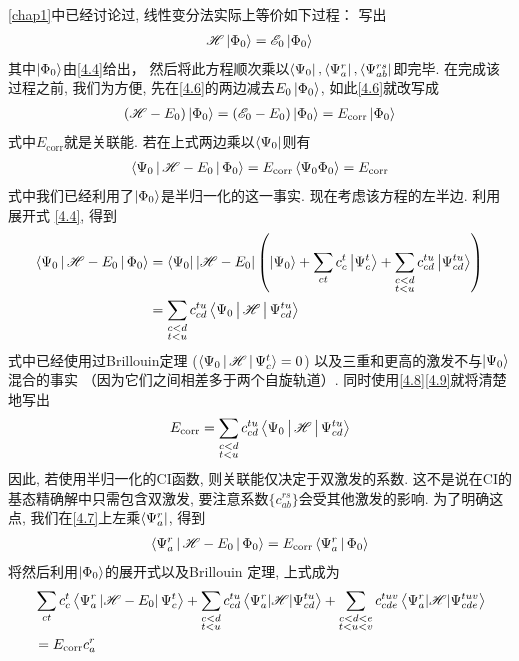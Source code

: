 \autoref*{chap1}中已经讨论过, 线性变分法实际上等价如下过程： 写出
\begin{align}
\mathscr{H}\Ket{\Phi_0} = \mathscr{E}_0\Ket{\Phi_0}
\label{4.6}
\end{align}
其中$ \Ket{\Phi_0} $由\eqref{4.4}给出， 
然后将此方程顺次乘以$ \Bra{\Psi_0},\Bra{\Psi_a^r} ,\Bra{\Psi_{ab}^{rs}}$即完毕. 
在完成该过程之前, 
我们为方便, 
先在\eqref{4.6}的两边减去$ E_0\Ket{\Phi_0} $, 
如此\eqref{4.6}就改写成
\begin{align}
(\mathscr{H} -E_0)\Ket{\Phi_0} = (\mathscr{E}_0-E_0)\Ket{\Phi_0} = E_\mathrm{corr} \Ket{\Phi_0}
\label{4.7}
\end{align} 
式中$E_\mathrm{corr}$就是关联能. 
若在上式两边乘以$\Bra{\Psi_0}$则有
\begin{align}
\Braket{\Psi_0|\mathscr{H}-E_0|\Phi_0} = E_\mathrm{corr} \Braket{\Psi_0\Phi_0} = E_\mathrm{corr}
\end{align}
式中我们已经利用了$\Ket{\Phi_0}$是半归一化的这一事实. 
现在考虑该方程的左半边. 
利用展开式 \eqref{4.4}, 
得到
\begin{align}
\Braket{\Psi_0|\mathscr{H}-E_0|\Phi_0} & = \Bra{\Psi_0}|\mathscr{H}-E_0|\left( \Ket{\Psi_0} + \sum_{ct}c_c^t\Ket{\Psi_c^t} + \sum_{\substack{c<d\\t<u}} c_{cd}^{tu}\Ket{\Psi_{cd}^{tu}} \right)\notag \\
&=\sum_{\substack{c<d\\t<u}}c_{cd}^{tu}\Braket{\Psi_0|\mathscr{H}|\Psi_{cd}^{tu}}
\end{align}
式中已经使用过Brillouin定理 ($ \Braket{\Psi_0|\mathscr{H}|\Psi_c^t }=0$) 以及三重和更高的激发不与$\Ket{\Psi_0}$混合的事实 （因为它们之间相差多于两个自旋轨道）. 
同时使用\eqref{4.8}\eqref{4.9}就将清楚地写出
\begin{align}
E_\mathrm{corr} = \sum_{\substack{c<d\\t<u}}c_{cd}^{tu}\Braket{\Psi_0|\mathscr{H}|\Psi_{cd}^{tu}}
\end{align}
因此, 
若使用半归一化的CI函数, 
则关联能仅决定于双激发的系数. 
这不是说在CI的基态精确解中只需包含双激发, 
要注意系数$ \{c_{ab}^{rs}\} $会受其他激发的影响. 
为了明确这点, 
我们在\eqref{4.7}上左乘$ \Bra{\Psi_a^r} $, 
得到
\begin{align}
\Braket{\Psi_a^r|\mathscr{H}-E_0|\Phi_0} = E_\mathrm{corr} \Braket{\Psi_a^r|\Phi_0}
\label{4.10}
\end{align}
将然后利用$\Ket{\Phi_0}$的展开式以及Brillouin 定理, 
上式成为
\begin{align}
&\sum_{c t} c_{c}^{t}\left\langle\Psi_{a}^{r}\left|\mathscr{H}-E_{0}\right| \Psi_{c}^{t}\right\rangle+\sum_{\substack{c<d \\ t<u}} c_{cd}^{t u}\left\langle\Psi_{a}^{r}|\mathscr{H}| \Psi_{c d}^{t u}\right\rangle+\sum_{\substack{c<d<e\\ t<u<v}} c_{c d e}^{t u v}\left\langle\Psi_{a}^{r}|\mathscr{H}| \Psi_{c d e}^{t u v}\right\rangle \notag \\
&=E_{\mathrm{corr}} c_{a}^{r}
\label{4.11}
\end{align}
